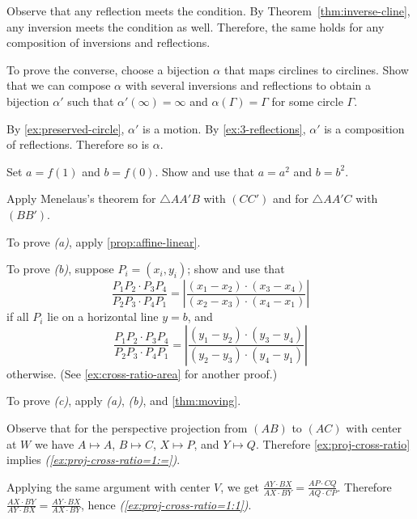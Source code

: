 Observe that any reflection meets the condition.
By Theorem~\ref{thm:inverse-cline}, any inversion meets the condition as well.
Therefore, the same holds for any composition of inversions and reflections.

To prove the converse, choose a bijection $\alpha$ that maps circlines to circlines.
Show that we can compose $\alpha$ with several inversions and reflections to obtain a bijection $\alpha'$ such that $\alpha'(\infty)=\infty$ and $\alpha(\Gamma)=\Gamma$ for some circle $\Gamma$.

By \ref{ex:preserved-circle}, $\alpha'$ is a motion.
By \ref{ex:3-reflections}, $\alpha'$ is a composition of reflections.
Therefore so is $\alpha$.

Set $a=f(1)$ and $b=f(0)$.
Show and use that $a=a^2$ and $b=b^2$.

 Apply Menelaus's theorem
for $\triangle AA'B$ with $(CC')$
and
for $\triangle AA'C$ with $(BB')$.

\setcounter{eqtn}{0}

To prove \textit{(a)}, apply \ref{prop:affine-linear}.

To prove \textit{(b)}, suppose $P_i=(x_i,y_i)$;
show and use that 
\[\frac{P_1P_2\cdot P_3P_4}{P_2P_3\cdot P_4P_1}
=\left|\frac{(x_1-x_2)\cdot(x_3-x_4)}{(x_2-x_3)\cdot (x_4-x_1)}\right|\]
if all $P_i$ lie on a horizontal line $y=b$, and
\[\frac{P_1P_2\cdot P_3P_4}{P_2P_3\cdot P_4P_1}
=\left|\frac{(y_1-y_2)\cdot(y_3-y_4)}{(y_2-y_3)\cdot (y_4-y_1)}\right|\]
otherwise. (See \ref{ex:cross-ratio-area} for another proof.)

To prove \textit{(c)}, apply \textit{(a)}, \textit{(b)}, and \ref{thm:moving}.

Observe that for the perspective projection from $(AB)$ to $(AC)$ with center at $W$ we have
$A\mapsto A$, $B\mapsto C$, $X\mapsto P$, and $Y\mapsto Q$.
Therefore \ref{ex:proj-cross-ratio} implies \textit{(\ref{ex:proj-cross-ratio=1:=})}.

Applying the same argument with center $V$, we get  
$\frac{AY\cdot BX}{AX\cdot BY}=\frac{AP\cdot CQ}{AQ\cdot CP}$.
Therefore 
$\frac{AX\cdot BY}{AY\cdot BX}=\frac{AY\cdot BX}{AX\cdot BY}$,
hence \textit{(\ref{ex:proj-cross-ratio=1:1})}.


